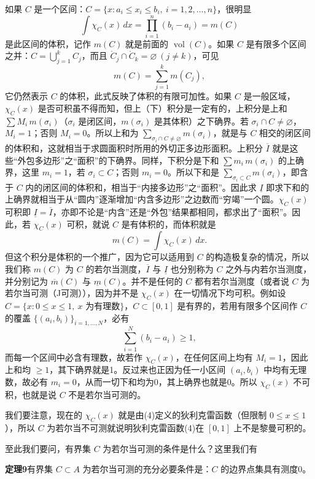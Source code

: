 如果 $C$ 是一个区间：$C=\{x:a_i\le x_i\le b_i,\ i=1,2,\ldots,n\}$，很明显
\[
 \int\chi_C(x)\,dx=\prod_{i=1}^{n}(b_i-a_i)=m(C)
\]
是此区间的体积，记作 $m(C)$ 就是前面的 $\operatorname{vol}(C)$。如果 $C$ 是有限多个区间之并：$C=\bigcup_{j=1}^{k}C_j$，而且 $\mathring C_j\cap\mathring C_k=\varnothing\ (j\ne k)$，可见
\[
 m(C)=\sum_{j=1}^{k}m(C_j),
\]
它仍然表示 $C$ 的体积，此式反映了体积的有限可加性。如果 $C$ 是一般区域，$\chi_C(x)$ 是否可积虽不得而知，但上（下）积分是一定有的，上积分是上和 $\sum M_i\,m(\sigma_i)$（$\sigma_i$ 是闭区间，$m(\sigma_i)$ 是其体积）之下确界。若 $\sigma_i\cap C\ne\varnothing$，$M_i=1$；否则 $M_i=0$。所以上和为 $\sum_{\sigma_i\cap C\ne\varnothing}m(\sigma_i)$，就是与 $C$ 相交的闭区间的体积和，这就相当于求圆面积时所用的外切正多边形面积。上积分 $\overline I$ 就是这些“外包多边形”之“面积”的下确界。同样，下积分是下和 $\sum m_i\,m(\sigma_i)$ 的上确界，这里 $m_i=1$，若 $\sigma_i\subset C$；否则 $m_i=0$。所以下和是 $\sum_{\sigma_i\subset C}m(\sigma_i)$，即含于 $C$ 内的闭区间的体积和，相当于“内接多边形”之“面积”。因此求 $\underline I$ 即求下和的上确界就相当于从“圆内”逐渐增加“内含多边形”之边数而“穷竭”一个圆。$\chi_C(x)$ 可积即 $\underline I=\overline I$，亦即不论是“内含”还是“外包”结果都相同，都求出了“面积”。因此，若 $\chi_C(x)$ 可积，就说 $C$ 是有体积的，而体积就是
\[
 m(C)=\int\chi_C(x)\,dx.
\]
但这个积分是体积的一个推广，因为它可以适用到 $C$ 的构造极复杂的情况，所以我们称 $m(C)$ 为 $C$ 的若尔当测度，$\overline I$ 与 $\underline I$ 也分别称为 $C$ 之外与内若尔当测度，并分别记为 $\overline m(C)$ 与 $\underline m(C)$。并不是任何的 $C$ 都有若尔当测度（或者说 $C$ 为若尔当可测（J可测）），因为并不是 $\chi_C(x)$ 在一切情况下均可积。例如设 $C=\{x:0\le x\le1,\ x\text{ 为有理数}\}$，$C\subset[0,1]$ 是有界的，若用有限多个区间作 $C$ 的覆盖 $\{(a_i,b_i)\}_{i=1,\ldots,N}$，必有
\[
 \sum_{i=1}^{N}(b_i-a_i)\ge1,
\]
而每一个区间中必含有理数，故若作 $\chi_C(x)$，在任何区间上均有 $M_i=1$，因此上和均 $\ge1$，其下确界就是1。反过来也正因为任一小区间 $(a_i,b_i)$ 中均有无理数，故必有 $m_i=0$，从而一切下和均为0，其上确界也就是0。所以 $\chi_C(x)$ 不可积，也就是说 $C$ 不是若尔当可测的。

我们要注意，现在的 $\chi_C(x)$ 就是由(4)定义的狄利克雷函数（但限制 $0\le x\le1$），所以 $C$ 为若尔当不可测就说明狄利克雷函数(4)在 $[0,1]$ 上不是黎曼可积的。

至此我们要问，有界集 $C$ 为若尔当可测的条件是什么？这里我们有

\noindent\textbf{定理9}\quad 有界集 $C\subset A$ 为若尔当可测的充分必要条件是：$C$ 的边界点集具有测度0。

